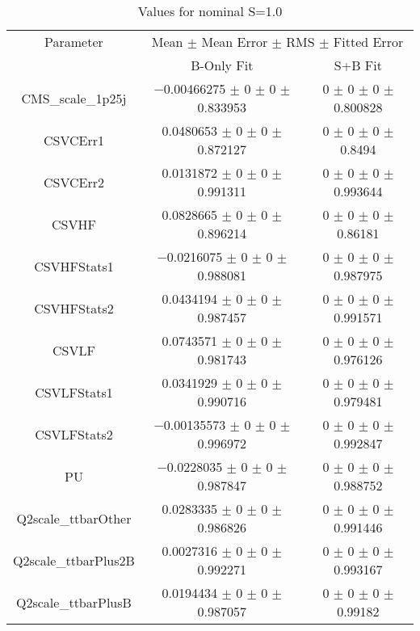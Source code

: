 \begin{table}
\centering
\caption{Values for nominal S=1.0}
\begin{tabular}{ccc}
\toprule
Parameter & \multicolumn{2}{c}{Mean $\pm$ Mean Error $\pm$ RMS $\pm$ Fitted Error}\\
 & B-Only Fit & S+B Fit\\
\midrule
CMS\_scale\_1p25j & \num{-0.00466275} $\pm$ \num{0} $\pm$ \num{0} $\pm$ \num{0.833953} & \num{0} $\pm$ \num{0} $\pm$ \num{0} $\pm$ \num{0.800828}\\
CSVCErr1 & \num{0.0480653} $\pm$ \num{0} $\pm$ \num{0} $\pm$ \num{0.872127} & \num{0} $\pm$ \num{0} $\pm$ \num{0} $\pm$ \num{0.8494}\\
CSVCErr2 & \num{0.0131872} $\pm$ \num{0} $\pm$ \num{0} $\pm$ \num{0.991311} & \num{0} $\pm$ \num{0} $\pm$ \num{0} $\pm$ \num{0.993644}\\
CSVHF & \num{0.0828665} $\pm$ \num{0} $\pm$ \num{0} $\pm$ \num{0.896214} & \num{0} $\pm$ \num{0} $\pm$ \num{0} $\pm$ \num{0.86181}\\
CSVHFStats1 & \num{-0.0216075} $\pm$ \num{0} $\pm$ \num{0} $\pm$ \num{0.988081} & \num{0} $\pm$ \num{0} $\pm$ \num{0} $\pm$ \num{0.987975}\\
CSVHFStats2 & \num{0.0434194} $\pm$ \num{0} $\pm$ \num{0} $\pm$ \num{0.987457} & \num{0} $\pm$ \num{0} $\pm$ \num{0} $\pm$ \num{0.991571}\\
CSVLF & \num{0.0743571} $\pm$ \num{0} $\pm$ \num{0} $\pm$ \num{0.981743} & \num{0} $\pm$ \num{0} $\pm$ \num{0} $\pm$ \num{0.976126}\\
CSVLFStats1 & \num{0.0341929} $\pm$ \num{0} $\pm$ \num{0} $\pm$ \num{0.990716} & \num{0} $\pm$ \num{0} $\pm$ \num{0} $\pm$ \num{0.979481}\\
CSVLFStats2 & \num{-0.00135573} $\pm$ \num{0} $\pm$ \num{0} $\pm$ \num{0.996972} & \num{0} $\pm$ \num{0} $\pm$ \num{0} $\pm$ \num{0.992847}\\
PU & \num{-0.0228035} $\pm$ \num{0} $\pm$ \num{0} $\pm$ \num{0.987847} & \num{0} $\pm$ \num{0} $\pm$ \num{0} $\pm$ \num{0.988752}\\
Q2scale\_ttbarOther & \num{0.0283335} $\pm$ \num{0} $\pm$ \num{0} $\pm$ \num{0.986826} & \num{0} $\pm$ \num{0} $\pm$ \num{0} $\pm$ \num{0.991446}\\
Q2scale\_ttbarPlus2B & \num{0.0027316} $\pm$ \num{0} $\pm$ \num{0} $\pm$ \num{0.992271} & \num{0} $\pm$ \num{0} $\pm$ \num{0} $\pm$ \num{0.993167}\\
Q2scale\_ttbarPlusB & \num{0.0194434} $\pm$ \num{0} $\pm$ \num{0} $\pm$ \num{0.987057} & \num{0} $\pm$ \num{0} $\pm$ \num{0} $\pm$ \num{0.99182}\\

\end{tabular}
\end{table}
